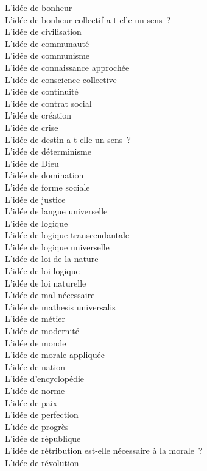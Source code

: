\documentclass[a4paper,12pt]{article}
\begin{document}
L'idée de bonheur \\
L'idée de bonheur collectif a-t-elle un sens ? \\
L'idée de civilisation \\
L'idée de communauté \\
L'idée de communisme \\
L'idée de connaissance approchée \\
L'idée de conscience collective \\
L'idée de continuité \\
L'idée de contrat social \\
L'idée de création \\
L'idée de crise \\
L'idée de destin a-t-elle un sens ? \\
L'idée de déterminisme \\
L'idée de Dieu \\
L'idée de domination \\
L'idée de forme sociale \\
L'idée de justice \\
L'idée de langue universelle \\
L'idée de logique \\
L'idée de logique transcendantale \\
L'idée de logique universelle \\
L'idée de loi de la nature \\
L'idée de loi logique \\
L'idée de loi naturelle \\
L'idée de mal nécessaire \\
L'idée de mathesis universalis \\
L'idée de métier \\
L'idée de modernité \\
L'idée de monde \\
L'idée de morale appliquée \\
L'idée de nation \\
L'idée d'encyclopédie \\
L'idée de norme \\
L'idée de paix \\
L'idée de perfection \\
L'idée de progrès \\
L'idée de république \\
L'idée de rétribution est-elle nécessaire à la morale ? \\
L'idée de révolution \\
\end{document}

